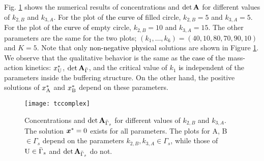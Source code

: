 \documentclass[ amsmath,amssymb,nofootinbib
]{revtex4-1}
\def\bal#1\eal{\begin{align}#1\end{align}}
\def\mbf#1{\mbox{\boldmath $#1$}}
\newcommand{\detA}{{\rm det}\,  {\bf A}}
\newcommand{\gs}{{\Gamma_s}}
\newcommand{\gbs}{{\bar{\Gamma}_s}}
\newcommand{\red}[1]{\textcolor{black}{#1}}
\begin{document}
%



Fig. \ref{fig:tcapp} shows the numerical results of concentrations and $\detA$ for  different values of $k_{2,B}$ and $k_{3,A}$.
For the plot of \red{the curve of} filled circle,  $k_{2,B}=5$ and $k_{3,A}=5$.
For the plot of \red{the curve of} empty circle,  $k_{2,B}=10$ and $k_{3,A}=15$.
The other parameters are the same for the two plots; $(k_1,\ldots, k_6)=(40, 10, 80, 70, 90, 10)$ and $K=5$.
Note that only \red{non-negative physical} solutions are shown in Figure \ref{fig:tcapp}. We observe that the qualitative behavior is the same as  \red{the case of} the mass-action kinetics: $x^*_{{\rm U}}$, $\detA_{\bar \Gamma}$,
and the critical value of $k_1$ \red{is} independent of the parameters inside the buffering structure.  On the other hand,  the positive solutions of $x^*_{{\rm A}}$ and $x^*_{{\rm B}}$ depend on these parameters.


\begin{figure}[htbp]
\centering
  \texttt{[image: tccomplex]}
   \caption{Concentrations and $\detA_{\gbs}$ for different values of $k_{2,B}$ and $k_{3,A}$. The solution ${\mbf x}^*=0$ exists for all parameters. The plots for A, B $\in \gs$  depend on  the parameters $k_{2,B},k_{3,A} \in \gs$, while those of ${\rm U}\in \gbs$  and $\detA_\gbs$ do not.   }
   \label{fig:tcapp}
\end{figure}
\end{document}
